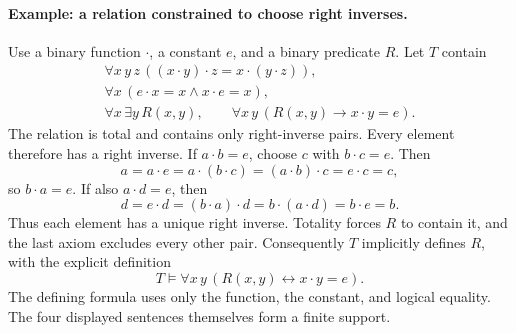 \paragraph{Example: a relation constrained to choose right inverses.}
Use a binary function \(\cdot\), a constant \(e\), and a binary predicate
\(R\).  Let \(T\) contain
\[
\begin{gathered}
 \forall x\,y\,z\,((x\cdot y)\cdot z=x\cdot(y\cdot z)),\\
 \forall x\,(e\cdot x=x\land x\cdot e=x),\\
 \forall x\,\exists y\,R(x,y),\qquad
 \forall x\,y\,(R(x,y)\to x\cdot y=e).
\end{gathered}
\]
The relation is total and contains only right-inverse pairs.
Every element therefore has a right inverse.
If \(a\cdot b=e\), choose \(c\) with \(b\cdot c=e\).  Then
\[
 a=a\cdot e=a\cdot(b\cdot c)
   =(a\cdot b)\cdot c=e\cdot c=c,
\]
so \(b\cdot a=e\).
If also \(a\cdot d=e\), then
\[
 d=e\cdot d=(b\cdot a)\cdot d
   =b\cdot(a\cdot d)=b\cdot e=b.
\]
Thus each element has a unique right inverse.  Totality forces \(R\)
to contain it, and the last axiom excludes every other pair.
Consequently \(T\) implicitly defines \(R\), with the explicit definition
\[
 T\models\forall x\,y\,
             (R(x,y)\leftrightarrow x\cdot y=e).
\]
The defining formula uses only the function, the constant, and logical
equality.  The four displayed sentences themselves form a finite support.
